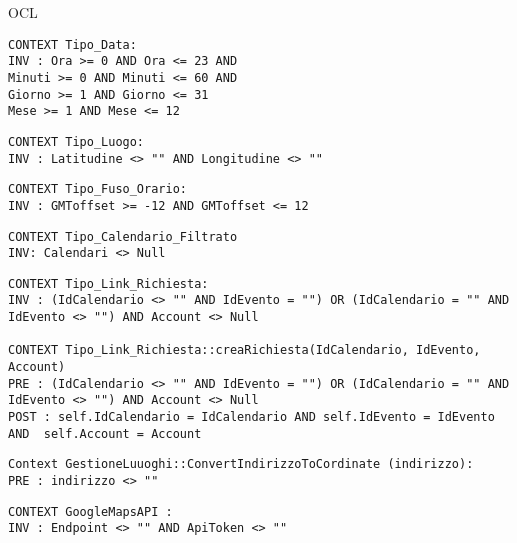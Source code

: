\begin{listaPersonale}{OCL}
    \begin{lstlisting}
CONTEXT Tipo_Data:
INV : Ora >= 0 AND Ora <= 23 AND
Minuti >= 0 AND Minuti <= 60 AND
Giorno >= 1 AND Giorno <= 31
Mese >= 1 AND Mese <= 12
    \end{lstlisting}




    \begin{lstlisting}
CONTEXT Tipo_Luogo:
INV : Latitudine <> "" AND Longitudine <> "" 
    \end{lstlisting}




    \begin{lstlisting}
CONTEXT Tipo_Fuso_Orario:
INV : GMToffset >= -12 AND GMToffset <= 12 
    \end{lstlisting}




    \begin{lstlisting}
CONTEXT Tipo_Calendario_Filtrato
INV: Calendari <> Null
    \end{lstlisting}




    \begin{lstlisting}
CONTEXT Tipo_Link_Richiesta:
INV : (IdCalendario <> "" AND IdEvento = "") OR (IdCalendario = "" AND IdEvento <> "") AND Account <> Null

CONTEXT Tipo_Link_Richiesta::creaRichiesta(IdCalendario, IdEvento, Account)
PRE : (IdCalendario <> "" AND IdEvento = "") OR (IdCalendario = "" AND IdEvento <> "") AND Account <> Null
POST : self.IdCalendario = IdCalendario AND self.IdEvento = IdEvento AND  self.Account = Account  
    \end{lstlisting}




    \begin{lstlisting}
Context GestioneLuuoghi::ConvertIndirizzoToCordinate (indirizzo):
PRE : indirizzo <> ""
    \end{lstlisting}




    \begin{lstlisting}
CONTEXT GoogleMapsAPI :
INV : Endpoint <> "" AND ApiToken <> ""
    \end{lstlisting}





\end{listaPersonale}

